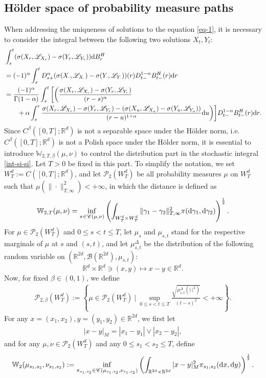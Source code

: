 \documentclass[12pt]{article}
\def\L{\mathscr{L}}
\def\R{\mathbb R}
\def\d{\text{\rm{d}}}
\def\W{\mathbb{W}}
\numberwithin{equation}{section}
\begin{document}
	\subsection{H\"older space of probability measure paths}
	When addressing the uniqueness of solutions to the equation \eqref{eq-1}, it is necessary to consider the integral between the following two solutions $X_t,Y_t$:
	\begin{equation}\label{int-si-si}
		\begin{split}
		&\int_s^t(\sigma(X_r,\L_{X_r})-\sigma(Y_r,\L_{Y_r}))\d B^H_r\\
		&=(-1)^{\alpha}\int_s^tD_{s+}^\alpha(\sigma(X_\cdot,\L_{X_\cdot})-\sigma(Y_\cdot,\L_{Y_\cdot}))(r)D_{t-}^{1-\alpha}B_{t-}^H(r)\d r\\
		&=\frac{(-1)^{\alpha}}{\Gamma(1-\alpha)}\int_s^t
		\bigg[\bigg(\frac{\sigma(X_r ,\L_{X_r})-\sigma(Y_r,\L_{Y_r})}{(r - s)^\alpha}\cr
		&\quad\quad+\alpha\int_s^r\frac{\sigma(X_r,\L_{X_r})-\sigma(Y_r,\L_{Y_r})-\left(\sigma(X_u,\L_{X_u})-\sigma(Y_u,\L_{Y_u})\right)}
		{(r - u)^{1+\alpha}}\d u\bigg)\bigg]D_{t-}^{1-\alpha}B_{t-}^H(r)\d r.
	\end{split}
	\end{equation}
	Since $C^\beta([0,T];\R ^d)$ is not a separable space under the H\"older norm, i.e. $C^\beta([0,T];\R ^d)$ is not a Polish space under the H\"older norm,  it is essential to introduce $\W_{2,T,\beta}(\mu,\nu)$ to control the distribution part in the stochastic integral \eqref{int-si-si}. Let $T>0$ be fixed in this part. To simplify the notation, we set $W_T^d:=C([0,T];\R^d)$, and let $\mathscr P_2(W_T^d)$ be all probability measures $\mu$ on $W_T^d$ such that $\mu(\|\cdot\|_{T,\infty}^2)<+\infty$,
	in which the distance is defined as
	\begin{align}\label{AddHO1}
		\W_{2,T}(\mu,\nu)=\inf_{\pi\in \mathscr C(\mu,\nu)}\left(\int_{W_T^d\times W_T^d}\|\gamma_1-\gamma_2\|_{T,\infty}^2\pi(\d \gamma_1,\d \gamma_2)\right)^\frac 1 2.
	\end{align}
	For $\mu\in\mathscr P_2(W_T^d)$ and $0\leq s<t\leq T$, let $\mu_s$ and $\mu_{s,t}$ stand for the respective marginals of $\mu$ at $s$ and $(s,t)$,
	and let $\mu_{s,t}^\Delta$ be the distribution of the following random variable on $(\R^{2d},\mathscr B(\R^{2d}),\mu_{s,t})$:
	\[\R^d\times\R^d\ni(x,y)\mapsto x-y\in\R^d.\]
	Now, for fixed $\beta\in(0,1)$, we define
	\begin{align}\label{AddHO3}
		\mathscr P_{2,\beta}(W_T^d):=\left\{\mu\in \mathscr P_2(W_T^d)~\Big|~\sup_{0\leq s<t\leq T}\frac {\sqrt{\mu_{s,t}^\Delta (|\cdot|^2)}} {(t-s)^\beta}<+\infty\right\}.
	\end{align}
	For any $x=(x_1,x_2),y=(y_1,y_2)\in\R^{2d}$, we first let
	\begin{align*}
		|x-y|_M=|x_1-y_1|\vee |x_2-y_2|,
	\end{align*}
	and for any $\mu,\nu\in\mathscr P_2(W_T^d)$ and any $0\leq s_1<s_2\leq T$, define
	\begin{align*}
		\W_{2}(\mu_{s_1,s_2},\nu_{s_1,s_2}):=\inf_{\pi_{s_1,s_2}\in\mathscr C(\mu_{s_1,s_2},\nu_{s_1,s_2})}\left(\int_{\R^{2d}\times\R^{2d}} |x-y|_M^2\pi_{s_1,s_2}(\d x ,\d y)\right)^\frac 1 2.
	\end{align*}
\end{document}
